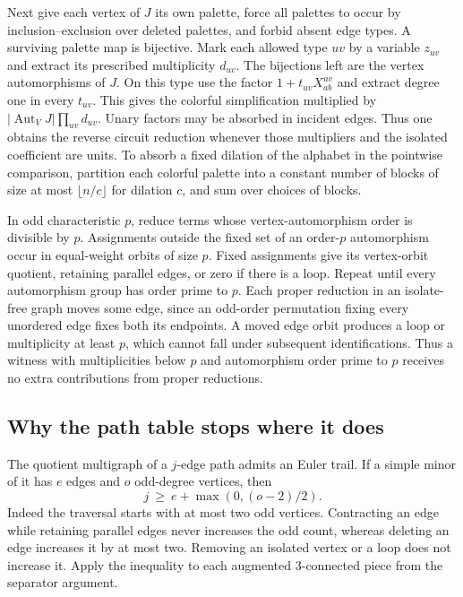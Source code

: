 \documentclass[11pt,letterpaper]{article}
\begin{document}
Next give each vertex of \(J\) its own palette, force all palettes to occur by inclusion--exclusion over deleted palettes, and forbid absent edge types. A surviving palette map is bijective. Mark each allowed type \(uv\) by a variable \(z_{uv}\) and extract its prescribed multiplicity \(d_{uv}\). The bijections left are the vertex automorphisms of \(J\). On this type use the factor \(1+t_{uv}X^{uv}_{ab}\) and extract degree one in every \(t_{uv}\). This gives the colorful simplification multiplied by \(|\operatorname{Aut}_V J|\prod_{uv}d_{uv}\). Unary factors may be absorbed in incident edges. Thus one obtains the reverse circuit reduction whenever those multipliers and the isolated coefficient are units. To absorb a fixed dilation of the alphabet in the pointwise comparison, partition each colorful palette into a constant number of blocks of size at most \(\lfloor n/c\rfloor\) for dilation \(c\), and sum over choices of blocks.

In odd characteristic \(p\), reduce terms whose vertex-automorphism order is divisible by \(p\). Assignments outside the fixed set of an order-\(p\) automorphism occur in equal-weight orbits of size \(p\). Fixed assignments give its vertex-orbit quotient, retaining parallel edges, or zero if there is a loop. Repeat until every automorphism group has order prime to \(p\). Each proper reduction in an isolate-free graph moves some edge, since an odd-order permutation fixing every unordered edge fixes both its endpoints. A moved edge orbit produces a loop or multiplicity at least \(p\), which cannot fall under subsequent identifications. Thus a witness with multiplicities below \(p\) and automorphism order prime to \(p\) receives no extra contributions from proper reductions.

\subsection{Why the path table stops where it does}\label{why-the-path-table-stops-where-it-does}

The quotient multigraph of a \(j\)-edge path admits an Euler trail. If a simple minor of it has \(e\) edges and \(o\) odd-degree vertices, then
\[
                        j\ \ge\ e+\max(0,(o-2)/2).
\]
Indeed the traversal starts with at most two odd vertices. Contracting an edge while retaining parallel edges never increases the odd count, whereas deleting an edge increases it by at most two. Removing an isolated vertex or a loop does not increase it. Apply the inequality to each augmented 3-connected piece from the separator argument.
\end{document}
